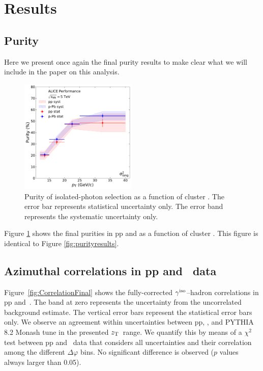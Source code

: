 \section{Results}
\label{sec:results}
\subsection{Purity}
Here we present once again the final purity results to make clear what we will include in the paper on this analysis.

\begin{figure}[h]
\center
\includegraphics[width=0.495\textwidth]{Purity/purities-combined-cluster_Lambda.pdf}
\caption{Purity of isolated-photon selection as a function of cluster \pt. The error bar represents statistical uncertainty only. The error band represents the systematic uncertainty only.}
\label{fig:purityresults_again}
\end{figure}


Figure \ref{fig:purityresults_again} shows the final purities in pp and \pPb as a function of cluster \pt. This figure is identical to Figure \ref{fig:purityresults}.



\subsection{Azimuthal correlations in pp and \pPb~data}


Figure~\ref{fig:CorrelationFinal} shows the fully-corrected $\gamma^\mathrm{iso}$--hadron correlations in pp and~\pPb. The band at zero represents the uncertainty from the uncorrelated background estimate. The vertical error bars represent the statistical error bars only. We observe an agreement within uncertainties between pp, \pPb, and \textsc{PYTHIA 8.2} Monash tune in the presented $z_{\mathrm{T}}$~range. We quantify this by means of a $\chi^{2}$ test between pp and \pPb~data that considers all uncertainties and their correlation among the different $\Delta\varphi$ bins. No significant difference is observed ($p$ values always larger than 0.05).   

